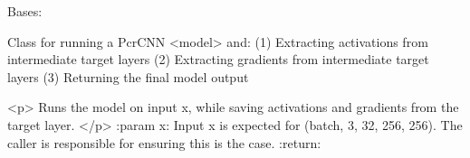 \documentclass[letterpaper,10pt,english]{sphinxmanual}
\begin{document}
\begin{fulllineitems}
\label{\detokenize{pay_attn_model_outputs:model_outputs.ModelOutputsPcrCNN}}
\pysigstartsignatures
\pysiglinewithargsret
{}
{\sphinxparamcomma {}}
{}
\pysigstopsignatures
\sphinxAtStartPar
Bases: 

\sphinxAtStartPar
Class for running a PcrCNN \textless{}model\textgreater{} and:
(1) Extracting activations from intermediate target layers
(2) Extracting gradients from intermediate target layers
(3) Returning the final model output

\begin{fulllineitems}
\label{\detokenize{pay_attn_model_outputs:model_outputs.ModelOutputsPcrCNN.get_gradients}}
\pysigstartsignatures
\pysiglinewithargsret
{}
{}
{}
\pysigstopsignatures
\end{fulllineitems}


\begin{fulllineitems}
\label{\detokenize{pay_attn_model_outputs:model_outputs.ModelOutputsPcrCNN.run_model}}
\pysigstartsignatures
\pysiglinewithargsret
{}
{}
{}
\pysigstopsignatures
\sphinxAtStartPar
\textless{}p\textgreater{}
Runs the model on input x, while saving activations and gradients from the target layer.
\textless{}/p\textgreater{}
:param x: Input x is expected for (batch, 3, 32, 256, 256). The caller is responsible for ensuring this is the case.
:return:

\end{fulllineitems}


\begin{fulllineitems}
\label{\detokenize{pay_attn_model_outputs:model_outputs.ModelOutputsPcrCNN.save_gradient}}
\pysigstartsignatures
\pysiglinewithargsret
{}
{}
{}
\pysigstopsignatures
\end{fulllineitems}


\end{fulllineitems}
\end{document}
